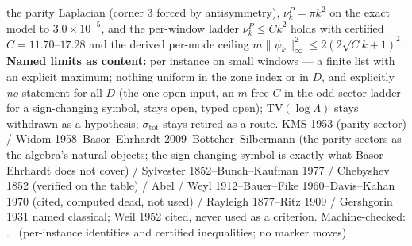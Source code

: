 \documentclass[11pt,a4paper]{article}
\theoremstyle{definition}
\begin{document}
the parity Laplacian (corner $3$ forced by antisymmetry), $\nu^P_k=\pi k^2$
on the exact model to $3.0\times10^{-5}$, and the per-window ladder
$\nu^P_k\le Ck^2$ holds with certified $C=11.70$--$17.28$ and the derived
per-mode ceiling $m\|\psi_k\|_\infty^2\le2(2\sqrt Ck+1)^2$.
\textbf{Named limits as content:} per instance on small windows --- a finite
list with an explicit maximum; nothing uniform in the zone index or in $D$,
and explicitly \emph{no} statement for all $D$ (the one open input, an
$m$-free $C$ in the odd-sector ladder for a sign-changing symbol, stays
open, typed open); $\mathrm{TV}(\log\Lambda)$ stays withdrawn as a
hypothesis; $\sigma_{\mathrm{tot}}$ stays retired as a route.
KMS 1953 (parity sector) / Widom 1958--Basor--Ehrhardt
2009--B\"ottcher--Silbermann (the parity sectors as the algebra's natural
objects; the sign-changing symbol is exactly what Basor--Ehrhardt does not
cover) / Sylvester 1852--Bunch--Kaufman 1977 / Chebyshev 1852 (verified on
the table) / Abel / Weyl 1912--Bauer--Fike 1960--Davis--Kahan 1970 (cited,
computed dead, not used) / Rayleigh 1877--Ritz 1909 / Gershgorin 1931 named
classical; Weil 1952 cited, never used as a criterion.
Machine-checked:
.
\mE\ (per-instance identities and certified inequalities; no marker moves)
\end{document}
